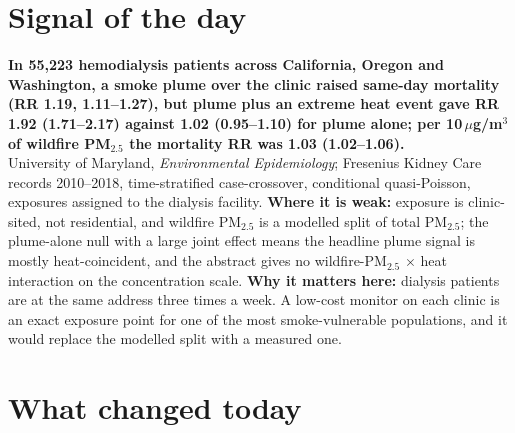 \documentclass[10pt]{article}
\begin{document}
\vspace{6mm}

\section*{\sffamily\bfseries\color{Deep}Signal of the day}
\vspace{-1.5mm}{\color{Amber}\rule{\linewidth}{1.1pt}}\vspace{2.5mm}

\begin{keybox}
{\sffamily\bfseries\small\color{Deep}In 55,223 hemodialysis patients across California, Oregon and Washington, a smoke plume over the clinic raised same-day mortality (RR 1.19, 1.11--1.27), but plume plus an extreme heat event gave RR 1.92 (1.71--2.17) against 1.02 (0.95--1.10) for plume alone; per 10\,$\mu$g/m$^3$ of wildfire PM$_{2.5}$ the mortality RR was 1.03 (1.02--1.06).}\\[1.4mm]
\footnotesize
University of Maryland, \textit{Environmental Epidemiology}; Fresenius Kidney Care records 2010--2018, time-stratified case-crossover, conditional quasi-Poisson, exposures assigned to the dialysis facility.
\textbf{Where it is weak:} exposure is clinic-sited, not residential, and wildfire PM$_{2.5}$ is a modelled split of total PM$_{2.5}$; the plume-alone null with a large joint effect means the headline plume signal is mostly heat-coincident, and the abstract gives no wildfire-PM$_{2.5}$ $\times$ heat interaction on the concentration scale.
\textbf{Why it matters here:} dialysis patients are at the same address three times a week. A low-cost monitor on each clinic is an exact exposure point for one of the most smoke-vulnerable populations, and it would replace the modelled split with a measured one.\par
\end{keybox}

\vspace{3mm}

\section*{\sffamily\bfseries\color{Deep}What changed today}
\vspace{-1.5mm}{\color{Amber}\rule{\linewidth}{1.1pt}}\vspace{2.5mm}
\end{document}
